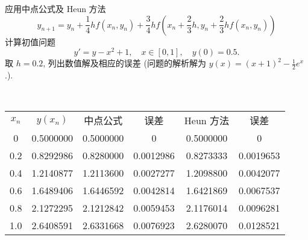 \documentclass[lang = zh]{iwork}
\begin{document}
\begin{prob}
  应用中点公式及 Heun 方法
  \begin{equation*}
    y_{n + 1} = y_n + \frac{1}{4} h f(x_n, y_n) + \frac{3}{4} h f(x_n + \frac{2}{3} h, y_n + \frac{2}{3} h f(x_n, y_n))
  \end{equation*}
  计算初值问题
  \begin{equation*}
    y' = y - x^2 + 1, \quad
    x \in [0, 1], \quad
    y(0) = 0.5.
  \end{equation*}
  取 $h = 0.2$, 列出数值解及相应的误差 (问题的解析解为 $y(x) = (x + 1)^2 - \frac{1}{2} e^x$.).
\end{prob}
\begin{sol} ~
  \begin{table}[htbp]
    \centering
    \begin{tabular}{SSSSSS} \null
      {$x_n$} & {$y(x_n)$} & {中点公式} & {误差}    & {Heun 方法} & {误差}    \\
      0       & 0.5000000  & 0.5000000  & 0         & 0.5000000   & 0         \\
      0.2     & 0.8292986  & 0.8280000  & 0.0012986 & 0.8273333   & 0.0019653 \\
      0.4     & 1.2140877  & 1.2113600  & 0.0027277 & 1.2098800   & 0.0042077 \\
      0.6     & 1.6489406  & 1.6446592  & 0.0042814 & 1.6421869   & 0.0067537 \\
      0.8     & 2.1272295  & 2.1212842  & 0.0059453 & 2.1176014   & 0.0096281 \\
      1.0     & 2.6408591  & 2.6331668  & 0.0076923 & 2.6280070   & 0.0128521
    \end{tabular}
  \end{table}
\end{sol}
\end{document}
